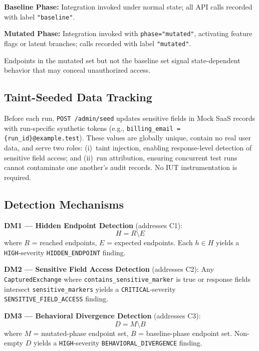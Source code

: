 \documentclass[conference]{IEEEtran}
\begin{document}
\textbf{Baseline Phase:} Integration invoked under normal state; all
API calls recorded with label \texttt{"baseline"}.

\textbf{Mutated Phase:} Integration invoked with
\texttt{phase="mutated"}, activating feature flags or latent branches;
calls recorded with label \texttt{"mutated"}.

Endpoints in the mutated set but not the baseline set signal
state-dependent behavior that may conceal unauthorized access.

\subsection{Taint-Seeded Data Tracking}

Before each run, \texttt{POST /admin/seed} updates sensitive fields in
Mock SaaS records with run-specific synthetic tokens (e.g.,
\texttt{billing\_email = \{run\_id\}@example.test}). These values are
globally unique, contain no real user data, and serve two roles:
(i)~taint injection, enabling response-level detection of sensitive
field access; and (ii)~run attribution, ensuring concurrent test runs
cannot contaminate one another's audit records. No IUT instrumentation
is required.

\subsection{Detection Mechanisms}

\textbf{DM1 --- Hidden Endpoint Detection} (addresses C1):
\begin{equation}
  H = R \setminus E
  \label{eq:hidden}
\end{equation}
where $R$ = reached endpoints, $E$ = expected endpoints. Each $h \in H$
yields a \texttt{HIGH}-severity \texttt{HIDDEN\_ENDPOINT} finding.

\textbf{DM2 --- Sensitive Field Access Detection} (addresses C2):
Any \texttt{CapturedExchange} where \texttt{contains\_sensitive\_marker}
is true or response fields intersect \texttt{sensitive\_markers} yields
a \texttt{CRITICAL}-severity \texttt{SENSITIVE\_FIELD\_ACCESS} finding.

\textbf{DM3 --- Behavioral Divergence Detection} (addresses C3):
\begin{equation}
  D = M \setminus B
  \label{eq:divergence}
\end{equation}
where $M$ = mutated-phase endpoint set, $B$ = baseline-phase endpoint
set. Non-empty $D$ yields a \texttt{HIGH}-severity
\texttt{BEHAVIORAL\_DIVERGENCE} finding.
\end{document}
